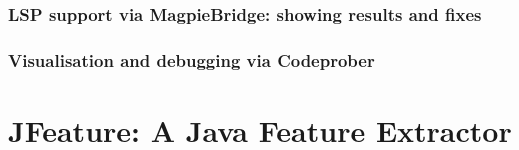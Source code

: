 \subsubsection{LSP support via MagpieBridge: showing results and fixes}

\subsubsection{Visualisation and debugging via Codeprober}



\section{JFeature: A Java Feature Extractor}






\label{sec:contribution}





